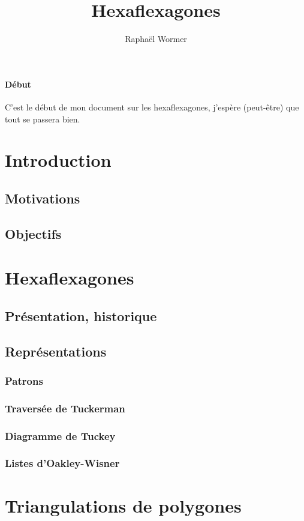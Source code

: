 \documentclass[10pt,a4paper]{article}
\author{Raphaël Wormer}
\title{Hexaflexagones}
\begin{document}
\maketitle
\tableofcontents

\paragraph{Début}
C'est le début de mon document sur les hexaflexagones, j'espère (peut-être) que tout se passera bien.

\section{Introduction}
	\subsection{Motivations}
	\subsection{Objectifs}

\section{Hexaflexagones}
	\subsection{Présentation, historique}
	\subsection{Représentations}
		\subsubsection{Patrons}
		\subsubsection{Traversée de Tuckerman}
		\subsubsection{Diagramme de Tuckey}
		\subsubsection{Listes d'Oakley-Wisner}
	
\section{Triangulations de polygones}
\end{document}
